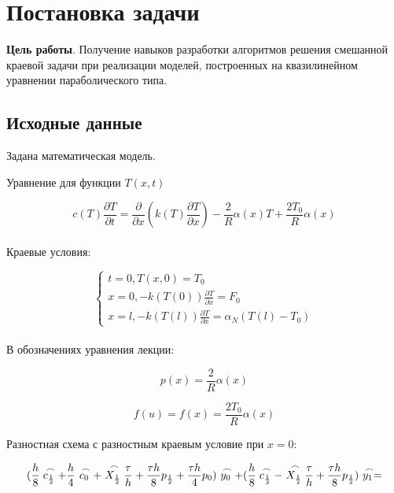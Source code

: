 \documentclass[a4paper,oneside,12pt]{extreport}
\begin{document}


\section{Постановка задачи}
\textbf{Цель работы}. 
Получение навыков разработки алгоритмов решения смешанной краевой
задачи при реализации моделей, построенных на квазилинейном уравнении
параболического типа.

\subsection{Исходные данные}

Задана математическая модель.

Уравнение для функции $T(x,t)$

\begin{equation}
	c(T) \frac{\partial T}{\partial t} = \frac{\partial}{\partial x} (k(T) \frac{\partial T}{\partial x}) - \frac{2}{R}\alpha(x)T + \frac{2T_{0}}{R}\alpha(x)
\end{equation}\\

Краевые условия:

\begin{equation}
	\begin{cases} t = 0, T(x, 0) = T_{0}
	\\ x = 0, - k(T(0)) \frac{\partial T}{\partial x} = F_{0}
	\\ x = l, - k(T(l)) \frac{\partial T}{\partial x} = \alpha_{N} (T(l) - T_{0})
	\end{cases}
\end{equation}\\

В обозначениях уравнения лекции:

\begin{equation}
	p(x) = \frac{2}{R} \alpha(x)
\end{equation}

\begin{equation}
	f(u) = f(x) = \frac{2T_{0}}{R}\alpha(x)
\end{equation}

Разностная схема с разностным краевым условие при $x = 0$:

\begin{equation*}
	(\frac{h}{8} \buildrel\,\,\frown\over{c_{\frac{1}{2}}} + \frac{h}{4} \buildrel\,\,\frown\over{c_{0}} + \buildrel\,\,\frown\over{X_{\frac{1}{2}}} \frac{\tau}{h} + \frac{\tau h}{8} p_{\frac{1}{2}} + \frac{\tau h}{4}p_{0}) \buildrel\,\,\frown\over{y_{0}} + (\frac{h}{8} \buildrel\,\,\frown\over{c_{\frac{1}{2}}} - \buildrel\,\,\frown\over{X_{\frac{1}{2}}} \frac{\tau}{h} + \frac{\tau h}{8} p_\frac{1}{2}) \buildrel\,\,\frown\over{y_{1}} = 
\end{equation*}
\end{document}
